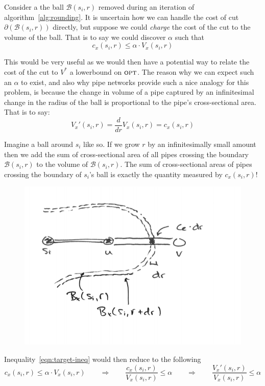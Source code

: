 Consider a the ball $\mathcal{B}(s_i, r)$ removed during an iteration of algorithm~\ref{alg:rounding}. It is uncertain how we can handle the cost of cut $\partial(\mathcal{B}(s_i, r))$ directly, but suppose we could \emph{charge} the cost of the cut to the volume of the ball. That is to say we could discover $\alpha$ such that
\begin{equation}\label{eqn:target-ineq}
c_x(s_i, r) \leq \alpha \cdot V_x(s_i, r)
\end{equation}

This would be very useful as we would then have a potential way to relate the cost of the cut to $V^*$ a lowerbound on $\textup{\textsc{opt}}$. The reason why we can expect such an $\alpha$ to exist, and also why pipe networks provide such a nice analogy for this problem, is because the change in volume of a pipe captured by an infinitesimal change in the radius of the ball is proportional to the pipe's cross-sectional area. That is to say:
\begin{equation*}
V_x'(s_i, r) = \frac{d}{dr} V_x(s_i, r) = c_x(s_i, r)
\end{equation*}

Imagine a ball around $s_i$ like so. If we grow $r$ by an infinitesimally small amount then we add the sum of cross-sectional area of all pipes crossing the boundary $\mathcal{B}(s_i, r)$ to the volume of $\mathcal{B}(s_i, r)$. The sum of cross-sectional areas of pipes crossing the boundary of $s_i$'s ball is exactly the quantity measured by $c_x(s_i, r)$!

\begin{figure}[h!]
    \centering
    \includegraphics[scale=0.6]{images/image-3.png}
\end{figure}
\vspace{-1em}
Inequality~\ref{eqn:target-ineq} would then reduce to the following
\begin{equation*}
c_x(s_i, r) \leq \alpha \cdot V_x(s_i, r)
\qquad\Longrightarrow\qquad
\frac{c_x(s_i, r)}{V_x(s_i, r)} \leq \alpha
\qquad\Longrightarrow\qquad
\frac{V_x'(s_i, r)}{V_x(s_i, r)} \leq \alpha
\end{equation*}

